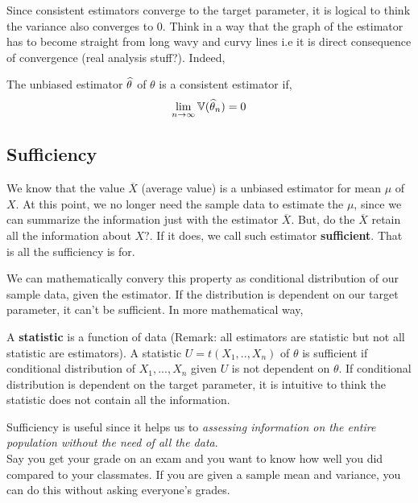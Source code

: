 Since consistent estimators converge to the target parameter, it is logical to think the variance also converges to $0$. Think in a way that the graph of the estimator has to become straight from long wavy and curvy lines i.e it is direct consequence of convergence (real analysis stuff?). Indeed,
\begin{theorem}
    The unbiased estimator ${\widehat{\theta}}$ of $\theta$ is a consistent estimator if, 
    \[ \lim_{n \rightarrow \infty} {\mathbb{V}}({\widehat{\theta}}_{n}) = 0 \]
\end{theorem}




\subsection*{Sufficiency}
We know that the value $\overline{X}$ (average value) is a unbiased estimator for mean $\mu$ of $X$. At this point, we no longer need the sample data to estimate the $\mu$, since we can summarize the information just with the estimator $\overline{X}$.
But, do the $\overline{X}$ retain all the information about $X$?. If it does, we call such estimator \textbf{sufficient}. That is all the sufficiency is for.

We can mathematically convery this property as conditional distribution of our sample data, given the estimator. If the distribution is dependent on our target parameter, it can't be sufficient. In more mathematical way,
\begin{definition}
    A \textbf{statistic} is a function of data (Remark: all estimators are statistic but not all statistic are estimators). A statistic $U = t(X_1,..,X_n)$ of $\theta$ is sufficient if conditional distribution of $X_1,...,X_n$ given $U$ is not dependent on $\theta$.
    \newline
    \newline
    If conditional distribution is dependent on the target parameter, it is intuitive to think the statistic does not contain all the information.
\end{definition}
Sufficiency is useful since it helps us to \textit{assessing information on the entire population without the need of all the data}.\\
Say you get your grade on an exam and you want to know how well you did compared to your classmates. If you are given a sample mean and variance, you can do this without asking everyone's grades.
